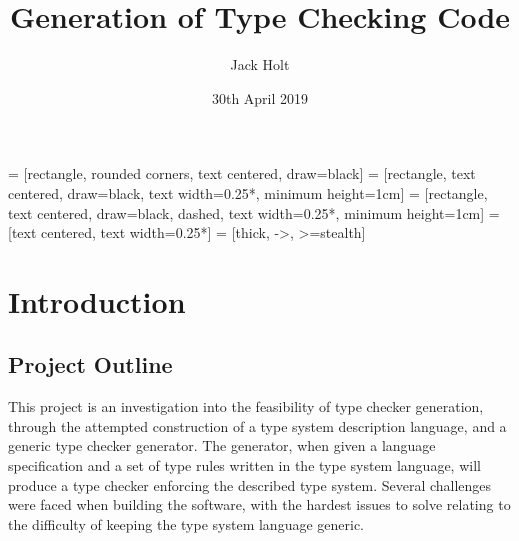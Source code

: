 \documentclass{UoYCSproject}
\title{Generation of Type Checking Code}
\author{Jack Holt}
\date{30th April 2019}
\begin{document}
 = [rectangle, rounded corners, text centered, draw=black]
 = [rectangle, text centered, draw=black,
text width=0.25*\columnwidth, minimum height=1cm]
 = [rectangle, text centered, draw=black, dashed,
text width=0.25*\columnwidth, minimum height=1cm]
 = [text centered, text width=0.25*\columnwidth]
 = [thick, ->, >=stealth]

\maketitle
\listoffigures
{}

\begin{summary}
\end{summary}

\chapter{Introduction}

\section{Project Outline}
This project is an investigation into the feasibility of type checker generation,
through the attempted construction of a type system description language, and a
generic type checker generator. The generator, when given a language specification 
and a set of type rules written in the type system language, will produce a 
type checker enforcing the described type system. Several challenges were faced 
when building the software, with the hardest issues to solve relating to the 
difficulty of keeping the type system language generic.
\end{document}
